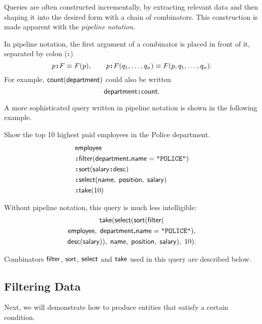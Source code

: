 Queries are often constructed incrementally, by extracting relevant data and
then shaping it into the desired form with a chain of combinators.  This
construction is made apparent with the \emph{pipeline notation}.

In pipeline notation, the first argument of a combinator is placed in front of
it, separated by colon ($\,\!\boldsymbol{:}\!\,$)
\begin{equation*}
    p \!\boldsymbol{:}\! F \equiv F(p), \qquad
    p \!\boldsymbol{:}\! F(q_1,\ldots,q_n) \equiv F(p,q_1,\ldots,q_n).
\end{equation*}
For example, $\textup{\textsf{count}}(\textup{\textsf{department}})$ could also be written
\begin{equation*}
    \textup{\textsf{department}}\!\boldsymbol{:}\!\textup{\textsf{count}}.
\end{equation*}

A more sophisticated query written in pipeline notation is shown in the
following example.

\begin{demo}
    \label{ex:top-ten-highest-paid-policemen}
    Show the top 10 highest paid employees in the Police department.
    \begin{align*}
        & \Employee \\
        & \Apply\Filter(\Department\To\Name = \textliteral{POLICE}) \\
        & \Apply\Sort(\Salary\Apply\Desc) \\
        & \Apply\Select(\Name,\; \Position,\; \Salary) \\
        & \Apply\Take(10)
    \end{align*}
\end{demo}

Without pipeline notation, this query is much less intelligible:
\begin{multline*}
    \textup{\textsf{take}}(\textup{\textsf{select}}(\textup{\textsf{sort}}(\textup{\textsf{filter}}( \\
    \textup{\textsf{employee}},\; \textup{\textsf{department}}\boldsymbol{.}\textup{\textsf{name}} = \textup{\texttt{"POLICE"}}), \\
    \textup{\textsf{desc}}(\textup{\textsf{salary}})),\; \textup{\textsf{name}},\; \textup{\textsf{position}},\; \textup{\textsf{salary}}),\; 10).
\end{multline*}

Combinators $\textup{\textsf{filter}}$, $\textup{\textsf{sort}}$, $\textup{\textsf{select}}$ and $\textup{\textsf{take}}$ used in this query are
described below.

\subsection*{Filtering Data}

Next, we will demonstrate how to produce entities that satisfy a certain
condition.

